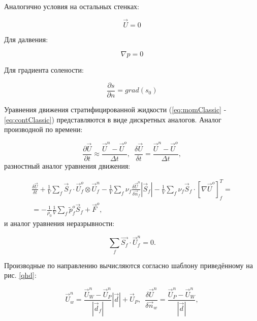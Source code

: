 Аналогично условия на остальных стенках:

\begin{equation}
    \vec{U} = 0
\end{equation}

Для далвения:

\begin{equation}
    \nabla p = 0
\end{equation}

Для градиента солености:

\begin{equation}
    \frac{\partial s}{\partial n} = grad(s_0)
\end{equation}

Уравнения движения стратифицированной жидкости (\ref{eq:momClassic} - \ref{eq:contClassic}) представляются в виде дискретных аналогов. Аналог производной по времени:

\begin{equation}\label{eq:qhd_Euler}
    \frac{\partial \vec{U}}{\partial t} \approx \frac{ \vec{U}^n-\vec{U}^o}{\Delta t}, \,\,\,  \frac{\delta \vec{U}}{\delta t} =  \frac{ \vec{U}^n-\vec{U}^o}{\Delta t},
\end{equation}
разностный аналог уравнения движения:

\begin{multline}\label{eq:qhd_approx_momentum}
    \frac{\delta \vec{U}}{\delta t} + \frac{1}{V} \sum_f \vec{S}_f \cdot \vec{U}^o_f \otimes \vec{U}^n_f  - \frac{1}{V} \sum_f \nu_f \frac{\delta\vec{U}^n}{\delta \vec{n}_f} |\vec{S}_f| - \frac{1}{V} \sum_f \nu_f \vec{S}_f \cdot [\nabla \vec U^o]_f^T = \\
    = - \frac{1}{\rho_0} \frac{1}{V} \sum_f \tilde p^o_f \vec S_f + \vec{F}^o,
\end{multline}
и аналог уравнения неразрывности:

\begin{equation}
    \sum_f \vec{S_f} \cdot \vec{U}_f^n = 0.
\end{equation}

Производные по направлению вычисляются согласно шаблону приведённому на рис. \ref{qhd}:

\begin{equation}
    \vec{U}_w^n= \frac{\vec{U}_W^n-\vec{U}_P^n}{|\vec{d}_f|}|\vec{d}|+\vec{U}_P, \,\,\, \frac{\delta\vec{U}^n}{\delta \vec{n}_w} = \frac{\vec{U}^n_P-\vec{U}^n_W}{|\vec{d}|},
\end{equation}

